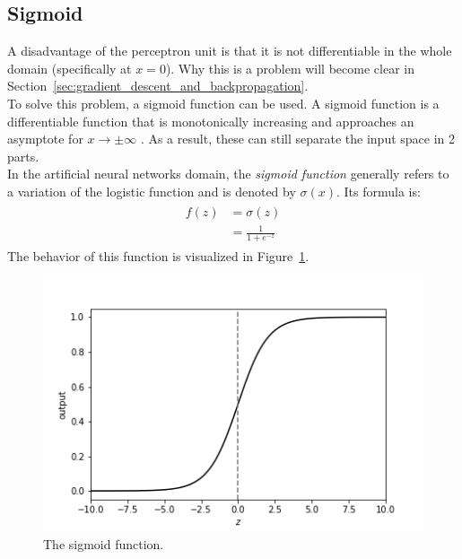 \subsection{Sigmoid} %
\label{sub:sigmoid}
A disadvantage of the perceptron unit is that it is not differentiable in the whole domain (specifically at $x=0$). Why this is a problem will become clear in Section~\ref{sec:gradient_descent_and_backpropagation}.\\
To solve this problem, a sigmoid function can be used.
A sigmoid function is a differentiable function that is monotonically increasing and approaches an asymptote for $x \to \pm \infty$ \parencite{lecun2012neural}.
As a result, these can still separate the input space in 2 parts.\\
In the artificial neural networks domain, the \textit{sigmoid function} generally refers to a variation of the logistic function and is denoted by $\sigma(x)$. Its formula is:
\begin{align}
    \begin{split}
        f(z) &= \sigma(z)\\
        &= \frac{1}{1+e^{-z}}
    \end{split}
\end{align}
The behavior of this function is visualized in Figure~\ref{fig:sigmoid}.
\begin{figure}[htb]
    \centering
    \includegraphics[width=.8\linewidth]{images/activation_functions/sigmoid.png}
    \caption[The sigmoid function]{The sigmoid function.}
    \label{fig:sigmoid}
\end{figure}

